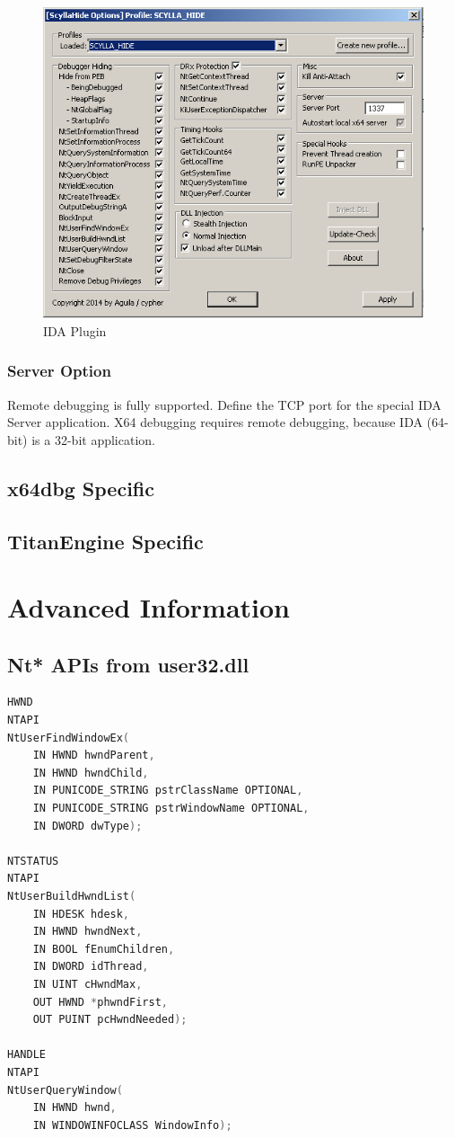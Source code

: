 \documentclass[10pt,a4paper]{article}
\begin{document}
\begin{figure}[H]
\centering
\includegraphics[scale=1]{idaplugin.PNG}
\caption{IDA Plugin}
\end{figure}

\subsubsection{Server Option}
Remote debugging is fully supported. Define the TCP port for the special IDA Server application. X64 debugging requires remote debugging, because IDA (64-bit) is a 32-bit application.

\subsection{x64dbg Specific}
\subsection{TitanEngine Specific}
\section{Advanced Information}
\subsection{Nt* APIs from user32.dll}

\begin{lstlisting}[language=C, caption=Special Nt* APIs declaration]
HWND
NTAPI
NtUserFindWindowEx(
    IN HWND hwndParent,
    IN HWND hwndChild,
    IN PUNICODE_STRING pstrClassName OPTIONAL,
    IN PUNICODE_STRING pstrWindowName OPTIONAL,
    IN DWORD dwType);

NTSTATUS
NTAPI
NtUserBuildHwndList(
    IN HDESK hdesk,
    IN HWND hwndNext,
    IN BOOL fEnumChildren,
    IN DWORD idThread,
    IN UINT cHwndMax,
    OUT HWND *phwndFirst,
    OUT PUINT pcHwndNeeded);

HANDLE
NTAPI
NtUserQueryWindow(
    IN HWND hwnd,
    IN WINDOWINFOCLASS WindowInfo);

\end{lstlisting}
\end{document}
